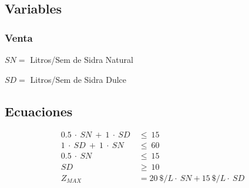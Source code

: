 \documentclass[a4paper,10pt]{article}
\begin{document}
\subsection{Variables}

 \subsubsection{Venta}
\vspace{2mm}
 $ SN = $ Litros/Sem de Sidra Natural
 
 $ SD = $ Litros/Sem de Sidra Dulce
 \vspace{2mm}
 
\subsection{Ecuaciones}

\begin{align*}
0.5\ \cdot \ SN\ + \ 1\ \cdot \ SD \ &\leq \ 15  \\
1\ \cdot \  SD\ +\ 1\ \cdot \ SN \ &\leq \ 60  \\
 0.5\ \cdot \ SN\ &\leq \ 15  \\
 SD \ &\geq\ 10  \\
 Z_{MAX} &= 20 \ \$/L \cdot \ SN + 15 \ \$/L \cdot \ SD \\
\end{align*}
\end{document}
